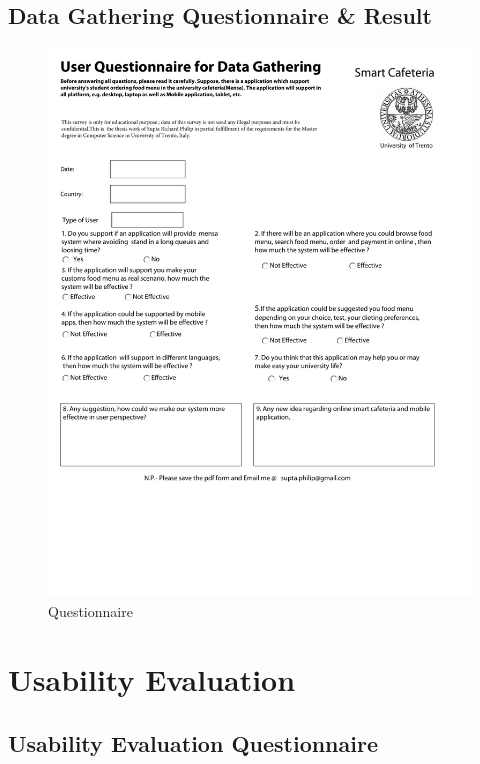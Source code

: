 \begin{appendices}
\section{Data Gathering Questionnaire \& Result}
\label{sec:DataGatheringQuestionnaire}
\begin{figure}[h!t]
    \centering
      \includegraphics[width=5.5in]{ch3/AppendixQuestionnaires/Questionnaire}
  \caption{Questionnaire}
  \label{Questionnaire}
\end{figure}

\clearpage
\newpage
\mbox{}

\chapter{Usability Evaluation}
\label{chap:UsabilityQuestionnaire}
\section{Usability Evaluation Questionnaire}
\label{sec:UsabilityEvaluationQuestionnaire}
%


\end{appendices}
